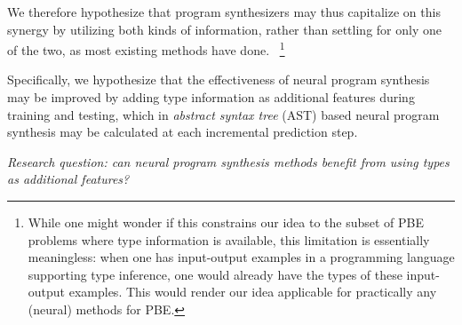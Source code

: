\documentclass{article}
\begin{document}
We therefore hypothesize that program synthesizers may thus capitalize on this synergy by utilizing both kinds of information,
rather than settling for only one of the two, as most existing methods have done.%
~\footnote{
    While one might wonder if this constrains our idea to the subset of PBE problems where type information is available,
    this limitation is essentially meaningless:
    when one has input-output examples in a programming language supporting type inference,
    one would already have the types of these input-output examples.
    This would render our idea applicable for practically any (neural) methods for PBE.
}%

Specifically, we hypothesize that the effectiveness of neural program synthesis may be improved by
adding type information as additional features during training and testing,
which in \emph{abstract syntax tree} (AST) based neural program synthesis may be calculated at each incremental prediction step.

\begin{displayquote} %
    \emph{Research question: can neural program synthesis methods benefit from using types as additional features?}
\end{displayquote}


\end{document}
